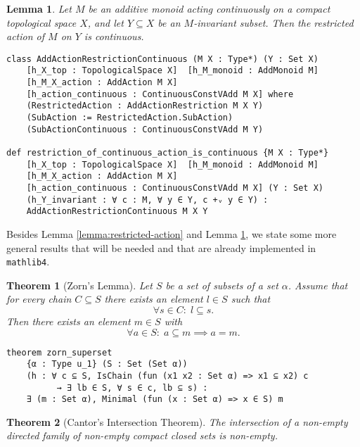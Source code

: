 \documentclass[11pt]{article}
\newtheorem{theorem}{Theorem}
\newtheorem{lemma}{Lemma}[section]
\theoremstyle{definition}              %
\theoremstyle{definition}              %
\theoremstyle{definition}              %
\begin{document}
\begin{lemma}\label{lemma:restricted-action-cont}
Let $M$ be an additive monoid acting continuously on a compact topological space $X$, and let $Y \subseteq X$ be an $M$-invariant subset. Then the restricted action of $M$ on $Y$ is continuous.
\end{lemma}

\begin{lstlisting}
class AddActionRestrictionContinuous (M X : Type*) (Y : Set X) 
    [h_X_top : TopologicalSpace X]  [h_M_monoid : AddMonoid M] 
    [h_M_X_action : AddAction M X] 
    [h_action_continuous : ContinuousConstVAdd M X] where
    (RestrictedAction : AddActionRestriction M X Y)
    (SubAction := RestrictedAction.SubAction)
    (SubActionContinuous : ContinuousConstVAdd M Y)

def restriction_of_continuous_action_is_continuous {M X : Type*} 
    [h_X_top : TopologicalSpace X]  [h_M_monoid : AddMonoid M] 
    [h_M_X_action : AddAction M X] 
    [h_action_continuous : ContinuousConstVAdd M X] (Y : Set X) 
    (h_Y_invariant : ∀ c : M, ∀ y ∈ Y, c +ᵥ y ∈ Y) : 
    AddActionRestrictionContinuous M X Y 
\end{lstlisting}

Besides Lemma \ref{lemma:restricted-action} and Lemma \ref{lemma:restricted-action-cont}, we state some more general results that will be needed and that are already implemented in \texttt{mathlib4}.

\begin{theorem}[Zorn's Lemma]\label{thm:zorn-lemma}
Let $S$ be a set of subsets of a set $\alpha$. Assume that for every chain $C \subseteq S$ there exists an element $l \in S$ such that 
\[\forall s \in C: \; l \subseteq s.\]
Then there exists an element $m \in S$ with 
\[\forall a \in S: \; a \subseteq m \implies a = m.\]
\end{theorem}

\begin{lstlisting}
theorem zorn_superset 
    {α : Type u_1} (S : Set (Set α)) 
    (h : ∀ c ⊆ S, IsChain (fun (x1 x2 : Set α) => x1 ⊆ x2) c 
          → ∃ lb ∈ S, ∀ s ∈ c, lb ⊆ s) :
    ∃ (m : Set α), Minimal (fun (x : Set α) => x ∈ S) m
\end{lstlisting}

\begin{theorem}[Cantor's Intersection Theorem]\label{thm:cantor-intersection}
The intersection of a non-empty directed family of non-empty compact closed sets is non-empty.
\end{theorem}
\end{document}
